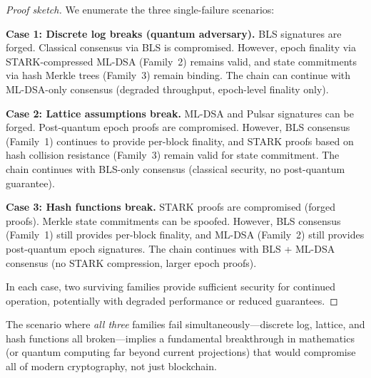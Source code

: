 \begin{proof}[Proof sketch]
We enumerate the three single-failure scenarios:

\textbf{Case 1: Discrete log breaks (quantum adversary).} BLS signatures are forged.
Classical consensus via BLS is compromised. However, epoch finality via
STARK-compressed ML-DSA (Family~2) remains valid, and state commitments via hash
Merkle trees (Family~3) remain binding. The chain can continue with ML-DSA-only
consensus (degraded throughput, epoch-level finality only).

\textbf{Case 2: Lattice assumptions break.} ML-DSA and Pulsar signatures can be
forged. Post-quantum epoch proofs are compromised. However, BLS consensus
(Family~1) continues to provide per-block finality, and STARK proofs based on
hash collision resistance (Family~3) remain valid for state commitment. The chain
continues with BLS-only consensus (classical security, no post-quantum guarantee).

\textbf{Case 3: Hash functions break.} STARK proofs are compromised (forged proofs).
Merkle state commitments can be spoofed. However, BLS consensus (Family~1) still
provides per-block finality, and ML-DSA (Family~2) still provides post-quantum
epoch signatures. The chain continues with BLS + ML-DSA consensus (no STARK
compression, larger epoch proofs).

In each case, two surviving families provide sufficient security for continued
operation, potentially with degraded performance or reduced guarantees.
\end{proof}

\begin{remark}
The scenario where \emph{all three} families fail simultaneously---discrete log,
lattice, and hash functions all broken---implies a fundamental breakthrough in
mathematics (or quantum computing far beyond current projections) that would
compromise all of modern cryptography, not just blockchain.
\end{remark}

